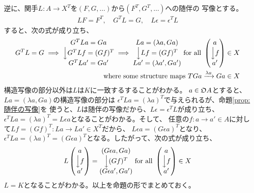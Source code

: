 {	逆に、関手$L:A\to X^T$を$(F,G,\dots)$から$(F^T,G^T,\dots)$への随伴の
	写像とする。
	\begin{equation*}\begin{split}
		LF = F^T ,\quad G^TL = G ,\quad L\epsilon = \epsilon^TL
	\end{split}\end{equation*}
	すると、次の式が成り立ち、
	\begin{equation*}\begin{split}
		G^TL=G \implies \begin{matrix}
			G^TLa = Ga \\ \Big\downarrow{G^TLf = (Gf)^T} \\ G^TLa' = Ga'
		\end{matrix} \implies \begin{matrix}
			La = (\lambda a, Ga) \\ \Big\downarrow{Lf=(Gf)^T} \\ La' = (\lambda a', Ga')
		\end{matrix} \text{ for all } \begin{pmatrix}
			a \\ \Big\downarrow{f} \\ a'
		\end{pmatrix}\in X \\
		\text{where some structure maps } TGa \xrightarrow[{}]{\lambda a} Ga \in X
	\end{split}\end{equation*}
	構造写像の部分以外は$L$は$K$に一致するすることがわかる。
	$a\in\mathfrak{O} A$とすると、$La=(\lambda a,Ga)$の構造写像の部分は
	$\epsilon^TLa=(\lambda a)^T$で与えられるが、命題\ref{prop:随伴の写像}を
	使うと、$L$は随伴の写像だから、$L\epsilon=\epsilon^TL$が成り立ち、
	$\epsilon^TLa=(\lambda a)^T=L\epsilon a$となることがわかる。そして、
	任意の$f:a\to a'\in A$に対して$Lf=(Gf)^T:La\to La'\in X^T$だから、
	$L\epsilon a=(G\epsilon a)^T$となり、$\epsilon^TLa=(\lambda a)^T
	=(G\epsilon a)^T$となる。したがって、次の式が成り立ち、
	\begin{equation*}\begin{split}
		L\begin{pmatrix}
			a \\ \Big\downarrow{f} \\ a'
		\end{pmatrix} = \begin{matrix}
			(G\epsilon a, Ga) \\ \Big\downarrow{(Gf)^T} \\ (G\epsilon a', Ga')
		\end{matrix} \text{ for all } \begin{pmatrix}
			a \\ \Big\downarrow{f} \\ a'
		\end{pmatrix} \in X \\
	\end{split}\end{equation*}
	$L=K$となることがわかる。以上を命題の形でまとめておく。

}

